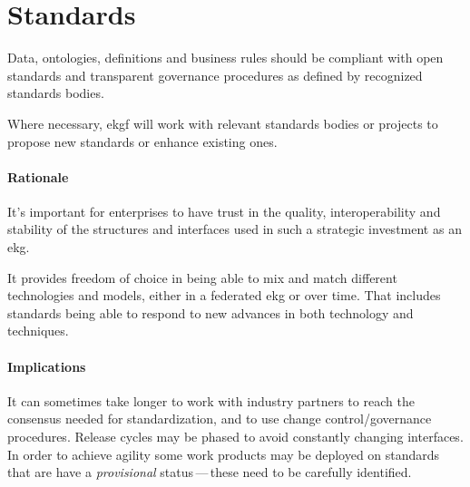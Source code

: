 \section{Standards}\label{ekg-principle-standards}

Data, ontologies, definitions and business rules should be compliant with open
standards and transparent governance procedures as defined by recognized standards
bodies.

Where necessary, \gls{ekgf} will work with relevant standards bodies or projects 
to propose new standards or enhance existing ones.

\paragraph{Rationale}

It's important for enterprises to have trust in the quality, 
interoperability and stability of the structures and interfaces 
used in such a strategic investment as an \gls{ekg}.

It provides freedom of choice in being able to mix and match different 
technologies and models, either in a federated \gls{ekg} or over time. 
That includes standards being able to respond to new advances in both 
technology and techniques. 

\paragraph{Implications}

It can sometimes take longer to work with industry partners to reach the 
consensus needed for standardization, and to use change control/governance procedures.
Release cycles may be phased to avoid constantly changing interfaces.
In order to achieve agility some work products may be deployed on standards 
that are have a \textit{provisional} status\,---\,these need to be carefully identified.
